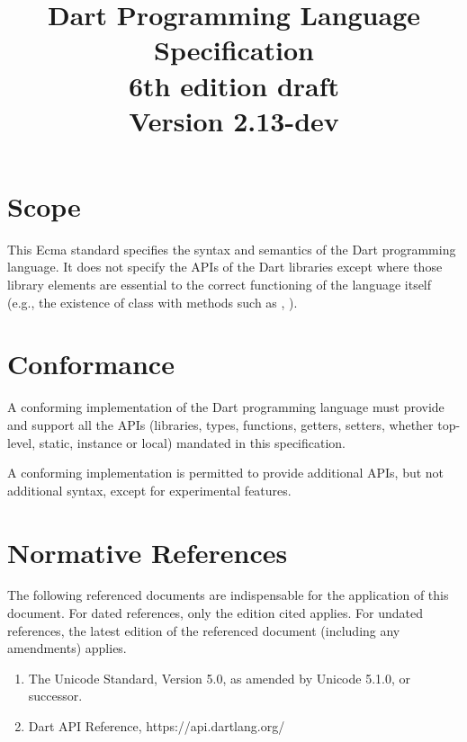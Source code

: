 \documentclass[makeidx]{article}
\title{Dart Programming Language Specification\\
{6th edition draft}\\
{\large Version 2.13-dev}}
\author{}
\begin{document}
\maketitle
\tableofcontents

\newpage

\pagestyle{myheadings}


\section{Scope}

\LMHash{}%
This Ecma standard specifies the syntax and semantics of
the Dart programming language.
It does not specify the APIs of the Dart libraries
except where those library elements are essential to
the correct functioning of the language itself
(e.g., the existence of class  with methods
such as , ).


\section{Conformance}

\LMHash{}%
A conforming implementation of the Dart programming language
must provide and support all the APIs
(libraries, types, functions, getters, setters,
whether top-level, static, instance or local)
mandated in this specification.

\LMHash{}%
A conforming implementation is permitted to provide additional APIs,
but not additional syntax,
except for experimental features.


\section{Normative References}

\LMHash{}%
The following referenced documents are indispensable for
the application of this document.
For dated references, only the edition cited applies.
For undated references, the latest edition of the referenced document
(including any amendments) applies.

\begin{enumerate}
\item
  The Unicode Standard, Version 5.0, as amended by Unicode 5.1.0, or successor.
\item
  Dart API Reference, https://api.dartlang.org/
\end{enumerate}
\end{document}

